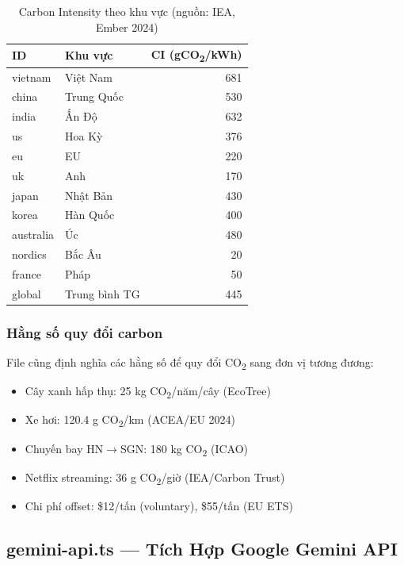 \documentclass[12pt,a4paper]{article}
\begin{document}
\begin{table}[h]
    \centering
    \begin{tabular}{llr}
        \toprule
        \textbf{ID} & \textbf{Khu vực} & \textbf{CI (gCO\textsubscript{2}/kWh)} \\
        \midrule
        vietnam & Việt Nam        & 681 \\
        china   & Trung Quốc      & 530 \\
        india   & Ấn Độ           & 632 \\
        us      & Hoa Kỳ          & 376 \\
        eu      & EU              & 220 \\
        uk      & Anh             & 170 \\
        japan   & Nhật Bản        & 430 \\
        korea   & Hàn Quốc        & 400 \\
        australia & Úc            & 480 \\
        nordics & Bắc Âu          & 20  \\
        france  & Pháp            & 50  \\
        global  & Trung bình TG   & 445 \\
        \bottomrule
    \end{tabular}
    \caption{Carbon Intensity theo khu vực (nguồn: IEA, Ember 2024)}
\end{table}

\subsubsection{Hằng số quy đổi carbon}

File cũng định nghĩa các hằng số để quy đổi CO\textsubscript{2} sang đơn vị tương đương:
\begin{itemize}
    \item Cây xanh hấp thụ: 25 kg CO\textsubscript{2}/năm/cây (EcoTree)
    \item Xe hơi: 120.4 g CO\textsubscript{2}/km (ACEA/EU 2024)
    \item Chuyến bay HN$\rightarrow$SGN: 180 kg CO\textsubscript{2} (ICAO)
    \item Netflix streaming: 36 g CO\textsubscript{2}/giờ (IEA/Carbon Trust)
    \item Chi phí offset: \$12/tấn (voluntary), \$55/tấn (EU ETS)
\end{itemize}

\subsection{gemini-api.ts — Tích Hợp Google Gemini API}
\end{document}

